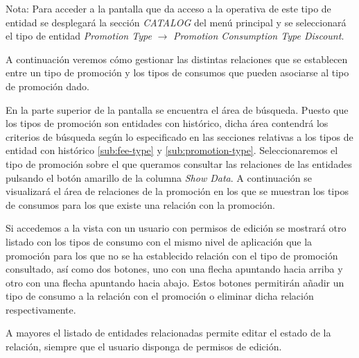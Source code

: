 Nota: Para acceder a la pantalla que da acceso a la operativa de este tipo de entidad se desplegará la sección \emph{CATALOG} del menú principal y se seleccionará el tipo de entidad \emph{Promotion Type} $\rightarrow$  \emph{Promotion Consumption Type Discount}.


A continuación veremos cómo gestionar las distintas relaciones que se establecen entre un tipo de promoción y los tipos de consumos que pueden asociarse al tipo de promoción dado.


En la parte superior de la pantalla se encuentra el área de búsqueda. Puesto que los tipos de promoción son entidades con histórico, dicha área contendrá los criterios de búsqueda según lo especificado en las secciones relativas a los tipos de entidad con histórico \ref{sub:fee-type} y \ref{sub:promotion-type}. 
Seleccionaremos el tipo de promoción sobre el que queramos consultar las relaciones de las entidades pulsando el botón amarillo de la columna \emph{Show Data}. A continuación se visualizará el área de relaciones de la promoción en los que se muestran los tipos de consumos para los que existe una relación con la promoción.


Si accedemos a la vista con un usuario con permisos de edición se mostrará otro listado con los tipos de consumo con el mismo nivel de aplicación que la promoción para los que no se ha establecido relación con el tipo de promoción consultado, así como dos botones, uno con una flecha apuntando hacia arriba y otro con una flecha apuntando hacia abajo. Estos botones permitirán añadir un tipo de consumo a la relación con el promoción o eliminar dicha relación respectivamente. 

A mayores el listado de entidades relacionadas permite editar el estado de la relación, siempre que el usuario disponga de permisos de edición.



